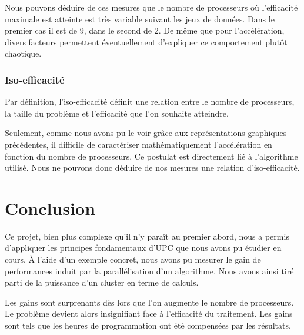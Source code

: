 \documentclass[a4paper,11pt]{report}
\begin{document}
Nous pouvons déduire de ces mesures que le nombre de processeurs où
l'efficacité maximale est atteinte est très variable suivant les jeux de
données. Dans le premier cas il est de 9, dans le second de 2. De même que
pour l'accélération, divers facteurs permettent éventuellement d'expliquer
ce comportement plutôt chaotique.

\subsection{Iso-efficacité}

Par définition, l'iso-efficacité définit une relation entre le nombre de
processeurs, la taille du problème et l'efficacité que l'on souhaite
atteindre.

Seulement, comme nous avons pu le voir grâce aux représentations graphiques
précédentes, il difficile de caractériser mathématiquement l'accélération en
fonction du nombre de processeurs. Ce postulat est directement lié à
l'algorithme utilisé. Nous ne pouvons donc déduire de nos mesures une relation
d'iso-efficacité.


\chapter*{Conclusion}

Ce projet, bien plus complexe qu'il n'y paraît au premier abord, nous a permis
d'appliquer les principes fondamentaux d'UPC que nous avons pu étudier en
cours. À l'aide d'un exemple concret, nous avons pu mesurer le gain de
performances induit par la parallélisation d'un algorithme. Nous avons ainsi
tiré parti de la puissance d'un cluster en terme de calculs.

Les gains sont surprenants dès lors que l'on augmente le nombre de
processeurs. Le problème devient alors insignifiant face à l'efficacité du
traitement. Les gains sont tels que les heures de programmation ont été
compensées par les résultats.
\end{document}
